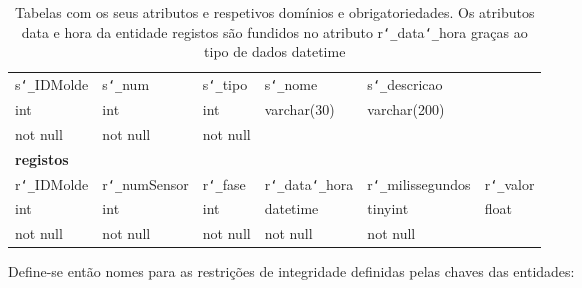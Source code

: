 \documentclass[11pt,twoside,a4paper]{report}
\begin{document}
\begin{table}[H]
\begin{tabular}{|l|l|l|l|l|l|}
		s\texttt{\char`_}IDMolde & s\texttt{\char`_}num & s\texttt{\char`_}tipo & s\texttt{\char`_}nome & s\texttt{\char`_}descricao & \multicolumn{1}{l}{}\\ \cline{1-5}
		int & int & int & varchar(30) & varchar(200) & \multicolumn{1}{l}{}\\ \cline{1-5}
		not null & not null & not null & & & \multicolumn{1}{l}{}\\ \cline{1-5}
		\multicolumn{6}{l}{\textbf{registos}}\\ \hline
		r\texttt{\char`_}IDMolde & r\texttt{\char`_}numSensor & r\texttt{\char`_}fase &  r\texttt{\char`_}data\texttt{\char`_}hora & r\texttt{\char`_}milissegundos & r\texttt{\char`_}valor\\ \hline
		int & int & int & datetime & tinyint & float\\ \hline
		not null & not null & not null & not null & not null & \\ \hline
	\end{tabular}
	\caption{Tabelas com os seus atributos e respetivos domínios e obrigatoriedades. Os atributos data e hora da entidade registos são fundidos no atributo r\texttt{\char`_}data\texttt{\char`_}hora graças ao tipo de dados datetime}
	\label{tab:dominio}
\end{table}
Define-se então nomes para as restrições de integridade definidas pelas chaves das entidades:
\end{document}
